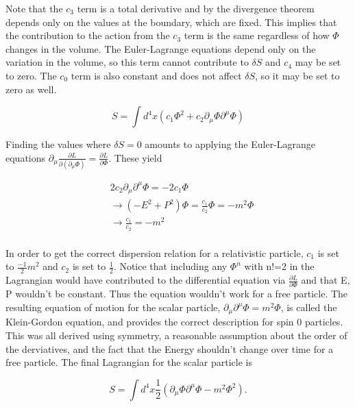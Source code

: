 Note that the $c_3$ term is a total derivative and by the divergence theorem depends only on the values at the boundary, which are fixed. This implies that the contribution to the action from the $c_3$ term is the same regardless of how $\Phi$ changes in the volume. The Euler-Lagrange equations depend only on the variation in the volume, so this term cannot contribute to $\delta S$ and $c_4$ may be set to zero. The $c_0$ term is also constant and does not affect $\delta S$, so it may be set to zero as well. 

\begin{equation}
S = \int d^4x \left(c_1 \Phi^2 + c_2 \partial_\mu\Phi\partial^\mu\Phi\right)
\end{equation}

Finding the values where $\delta S = 0$ amounts to applying the Euler-Lagrange equations $\partial_\mu \frac{\partial L}{\partial\left(\partial_\mu\Phi\right)} = \frac{\partial L}{\partial \Phi}$. These yield 

\begin{equation}
\begin{split}
&2c_2\partial_\mu\partial^\mu\Phi = -2c_1\Phi \\ 
&\rightarrow (-E^2 + P^2)\Phi = \frac{c_1}{c_2}\Phi = -m^2\Phi \\
&\rightarrow \frac{c_1}{c_2} = -m^2 \\
\end{split}
\end{equation}

In order to get the correct dispersion relation for a relativistic particle, $c_1$ is set to $\frac{-1}{2}m^2$ and $c_2$ is set to $\frac{1}{2}$. Notice that including any $\Phi^n$ with n!=2 in the Lagrangian would have contributed to the differential equation via $\frac{\partial L}{\partial \Phi}$ and that E, P wouldn't be constant. Thus the equation wouldn't work for a free particle. The resulting equation of motion for the scalar particle, $\partial_\mu\partial^\mu\Phi = m^2\Phi$, is called the Klein-Gordon equation, and provides the correct description for spin 0 particles. This was all derived using symmetry, a reasonable assumption about the order of the derviatives, and the fact that the Energy shouldn't change over time for a free particle. The final Lagrangian for the scalar particle is 

\begin{equation}
S = \int d^4x \frac{1}{2}\left(\partial_\mu\Phi\partial^\mu\Phi - m^2 \Phi^2 \right).
\end{equation}

